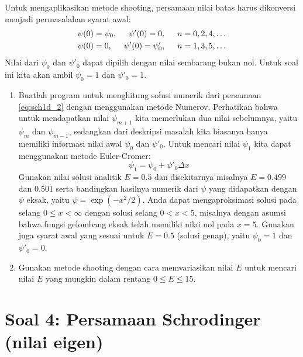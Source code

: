 \documentclass[12pt,bahasa]{article}
\begin{document}
Untuk mengaplikasikan metode shooting, persamaan nilai batas harus dikonversi menjadi
permasalahan syarat awal:
\begin{align}
\psi(0) & = \psi_{0},\hspace{0.5cm} \psi'(0) = 0,\hspace{0.5cm} n = 0,2,4,\ldots \\
\psi(0) & = 0,\hspace{0.5cm} \psi'(0) = \psi'_{0},\hspace{0.5cm} n = 1,3,5,\ldots
\end{align}
Nilai dari $\psi_0$ dan $\psi'_0$ dapat dipilih dengan nilai sembarang bukan nol.
Untuk soal ini kita akan ambil $\psi_0 = 1$ dan $\psi'_0 = 1$.

\begin{enumerate}[label=(\alph*)]
\item Buatlah program untuk menghitung solusi numerik dari persamaan \ref{eq:sch1d_2}
dengan menggunakan metode Numerov. Perhatikan bahwa untuk mendapatkan nilai $\psi_{m+1}$ kita memerlukan dua nilai
sebelumnya, yaitu $\psi_{m}$ dan $\psi_{m-1}$, sedangkan dari deskripsi masalah kita
biasanya hanya memiliki informasi nilai awal $\psi_{0}$ dan $\psi'_{0}$.
Untuk mencari nilai $\psi_{1}$ kita dapat menggunakan metode Euler-Cromer:
\begin{equation}
\psi_{1} = \psi_{0} + \psi'_{0}\Delta x
\end{equation}
Gunakan nilai solusi analitik $E = 0.5$ dan disekitarnya misalnya $E = 0.499$ dan $0.501$
serta bandingkan hasilnya numerik dari $\psi$ yang didapatkan dengan
$\psi$ eksak, yaitu $\psi = \exp(-x^2/2)$.
Anda dapat mengaproksimasi solusi pada selang $0 \leq x < \infty$
dengan solusi selang $0 < x < 5$, misalnya dengan asumsi bahwa fungsi gelombang
eksak telah memiliki nilai nol pada $x = 5$.
Gunakan juga syarat awal yang sesuai untuk $E = 0.5$ (solusi genap), yaitu
$\psi_{0} = 1$ dan $\psi'_{0} = 0$.
%
\item Gunakan metode shooting dengan cara memvariasikan nilai $E$ untuk mencari
nilai $E$ yang mungkin dalam rentang $0 \leq E \leq 15$.
\end{enumerate}


\section{Soal 4: Persamaan Schrodinger (nilai eigen)}
\end{document}
